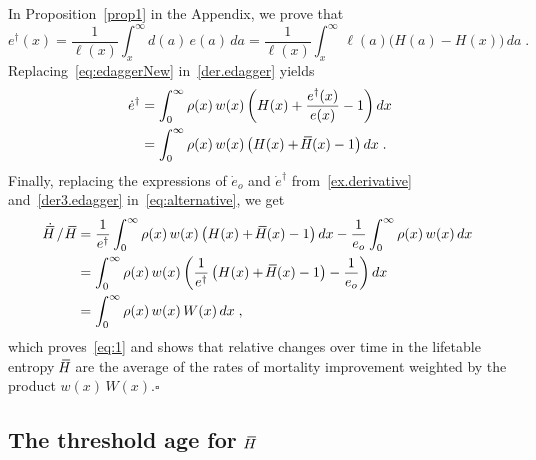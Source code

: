 \documentclass[a4paper,twoside, openright, 12pt, leqno]{article}
\newcommand*\xbar[1]{%
   \hbox{%
     \vbox{%
       \hrule height 0.5pt %
       \kern0.3ex%
       \hbox{%
         \kern-0.28em%
         \ensuremath{#1}%
         \kern-0.05em%
       }%
     }%
   }%
}
\begin{document}
In Proposition~\ref{prop1} in the Appendix, we prove that
%
\begin{equation}
e^\dagger(x)=\frac{1}{\ell(x)}\int_x^\infty d(a)\,e(a)\,da=\frac{1}{\ell(x)}\int_x^\infty\,\ell(a)\big(H(a)-H(x)\big)\,da\;.
\label{eq:edaggerNew}
\end{equation}
%
Replacing~\eqref{eq:edaggerNew} in~\eqref{der.edagger} yields
%
\begin{equation}
  \begin{split}
    \dot{e}^\dagger
        & = \int_0^\infty\rho(x)\,w(x)\left(H(x)+\frac{e^\dagger(x)}{e(x)}-1\right)dx                 \\
        & = \int_0^\infty\rho(x)\,w(x)\,\big(H(x)+\,\xbar{H}(x)-1\big)\,dx   \;.
  \end{split}
  \label{der3.edagger}
\end{equation}
%
Finally, replacing the expressions of $\dot{e}_o$ and $\dot{e}^\dagger$ from~\eqref{ex.derivative} and~\eqref{der3.edagger} in~\eqref{eq:alternative}, we get 
%
\begin{equation*}
 \begin{split}
    \dot{\xbar{H}}\,/\,\,\xbar{H}
        & = \frac{1}{e^\dagger}\int_0^\infty\rho(x)\,w(x)\left(H(x)+\,\xbar{H}(x)-1\right)dx-\frac{1}{e_o}\int_0^\infty\rho(x)\,w(x)\,dx    \\
        & = \int_0^\infty\rho(x)\,w(x)\left(\frac{1}{e^\dagger}\left(H(x)+\,\xbar{H}(x)-1\right)-\frac{1}{e_o}\right)dx                               \\
        & = \int_0^\infty\rho(x)\,w(x)\,W(x)\,dx\;,
 \end{split}
\end{equation*}
%
which proves~\eqref{eq:1} and shows that relative changes over time in the lifetable entropy $\,\xbar{H}$ are the average of the rates of mortality improvement weighted by the product $w(x)\,W(x)$.\hfill$\square$


\subsection{The threshold age for $\,\xbar{H}$}
\end{document}
